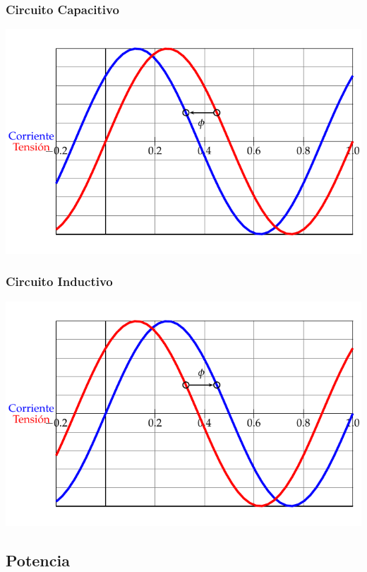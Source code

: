 \documentclass[serif, xcolor=dvipsnames]{beamer}
\begin{document}
\begin{frame}[plain]
  \frametitle{Circuito Capacitivo}

  \begin{center}
    \includegraphics{../figs/PlotCircuitoCapacitivo}
    \par\end{center}


\end{frame}
\begin{frame}[plain]
  \frametitle{Circuito Inductivo}

  \begin{center}
    \includegraphics{../figs/PlotCircuitoInductivo}
    \par\end{center}


\end{frame}
\subsection{Potencia}
\end{document}
